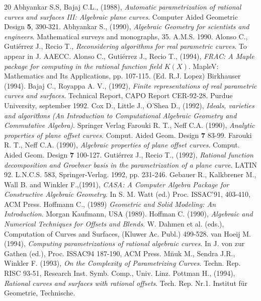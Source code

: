 \footnotesize
\begin{thebibliography}{20}
\bibitem{} Abhyankar S.S, Bajaj C.L., (1988), {\it Automatic 
parametrization of rational curves and surfaces III: Algebraic plane 
curves}. Computer Aided Geometric Design {\bf 5}, 390-321.
\bibitem{} Abhyankar S., (1990), {\it Algebraic Geometry for scientists 
and engineers}. Mathematical surveys and monographs, 35. A.M.S. 1990.
\bibitem{} Alonso C., Guti\'errez J., Recio T., 
{\it Reconsidering algorithms for real parametric curves}. To appear  
in J. AAECC.
\bibitem{} Alonso C., Guti\'errez J., Recio T., (1994), {\it FRAC: 
A Maple package for computing in the rational function field $K(X)$}. 
MapleV: Mathematics and Its Applications, pp. 107-115. (Ed. R.J. Lopez)  
Birkhauser (1994).
\bibitem{} Bajaj C., Royappa A. V., (1992), {\it Finite 
representations of real parametric curves and surfaces}. Technical 
Report, CAPO Report CER-92-28. Purdue University, september 1992.
\bibitem{} Cox D., Little J., O'Shea D., (1992), {\it Ideals, 
varieties and algorithms (An Introduction to Computational Algebraic 
Geometry and Commutative Algebra)}. Springer Verlag
\bibitem{} Farouki R. T., Neff C.A. (1990), {\it Analytic properties of 
plane offset curves}. Comput. Aided Geom. Design {\bf 7} 83-99.
\bibitem{} Farouki R. T., Neff C.A. (1990), {\it Algebraic properties of 
plane offset curves}. Comput. Aided Geom. Design {\bf 7} 100-127.
\bibitem{} Guti\'errez J., Recio T., (1992), {\it Rational 
function decomposition and Groebner basis in the parametrization 
of a plane curve}. LATIN 92. L.N.C.S. 583, Springer-Verlag. 1992, 
pp. 231-246.
\bibitem{} Gebauer R., Kalkbrener M., Wall B. and Winkler F.,(1991), 
{\it CASA: A Computer Algebra Package for Constructive Algebraic 
Geometry}. In S. M. Watt  (ed.) Proc. ISSAC'91, 403-410, ACM Press.
\bibitem{} Hoffmann C., (1989) {\it Geometric and Solid Modeling: An 
Introduction}. Morgan Kaufmann, USA (1989). 
\bibitem{} Hoffman C. (1990), {\it Algebraic and Numerical Techniques for 
Offsets and Blends}. W. Dahmen et al. (eds.), Computation of Curves and 
Surfaces, (Kluwer Ac. Publ.) 499-528.
\bibitem{} van Hoeij M. (1994), {\it Computing parametrizations of 
rational algebraic curves}. In J. von zur Gathen (ed.), Proc. ISSAC94 
187-190, ACM Press.
\bibitem{} M\"nuk M., Sendra J.R., Winkler F. (1993), {\it On the 
Complexity of Parametrizing Curves}. Techn. Rep. RISC 93-51, Research 
Inst. Symb. Comp., Univ. Linz.
\bibitem{} Pottman H.,  (1994), {\it Rational curves and surfaces with 
rational offsets}. Tech. Rep. Nr.1. Institut f\"ur Geometrie, Technische. 

\end{thebibliography}
